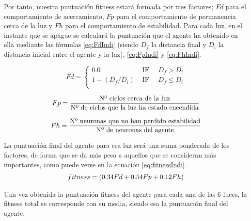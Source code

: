 Por tanto, nuestra puntuación fitness estará formada por tres factores; $Fd$ para el comportamiento de acercamiento, $Fp$ para el comportamiento de permanencia cerca de la luz y $Fh$ para el comportamiento de estabilidad. Para cada luz, en el instante que se apague se calculará la puntuación
que el agente ha obtenido en ella mediante las fórmulas \ref{eq:FdIndi} (siendo $D_{f}$ la distancia final y $D_{i}$ la distancia inicial entre el agente y la luz), \ref{eq:FpIndi} y \ref{eq:FhIndi}.

\begin{equation} \label{eq:FdIndi}
	Fd=\begin{cases}
0.0 & \text{ IF }\quad D_{f} > D_{i}  \\
1 - (D_{f} / D_{i}) & \text{ IF }\quad D_{f} \leq D_{i} \\
\end{cases}
\end{equation}


\begin{equation} \label{eq:FpIndi}
 \centering
	Fp = \frac{\text{Nº ciclos cerca de la luz}}{\text{Nº de ciclos que la luz ha estado encendida}}
\end{equation}

\begin{equation} \label{eq:FhIndi}
 \centering
	Fh = \frac{\text{Nº neuronas que no han perdido estabilidad}}{\text{Nº de neuronas del agente}}
\end{equation}

La puntuación final del agente para esa luz será una suma ponderada de los factores, de forma que se da más peso a aquellos que se consideran más importantes, como puede verse en la ecuación \ref{eq:fitnessIndi}.
\begin{equation} \label{eq:fitnessIndi}
 \centering
	fitness = (0.34Fd + 0.54Fp + 0.12Fh)
\end{equation}

Una vez obtenida la puntuación fitness del agente para cada una de las 6 luces, la fitness total se corresponde con su media, siendo esa la puntuación final del agente.

